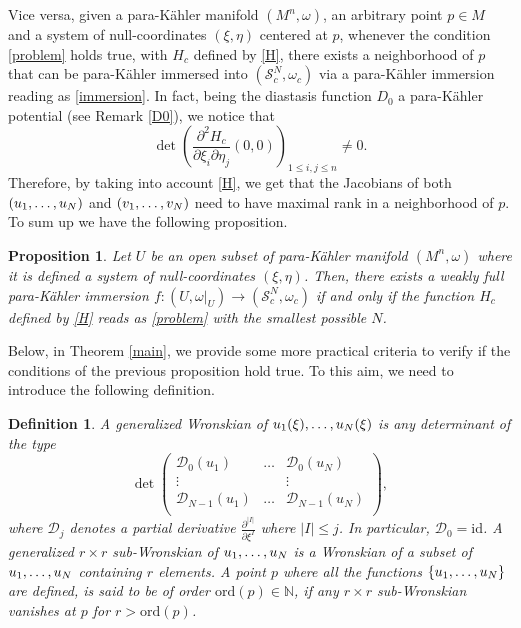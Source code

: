 \documentclass{article}
\newtheorem{df}[thm]{Definition}
\newtheorem{prop}[thm]{Proposition}
\newcommand{\de}{\partial}
\newcommand{\s}{\mathcal{S}}
\newcommand{\pk}{para-K\"ahler }
\newcommand{\ord}{\mathrm{ord}}
\newcommand{\N}{\mathds{N}}
\begin{document}
Vice versa, given a \pk manifold $(M^n,\omega)$, an arbitrary point $p\in M$ and a system of null-coordinates $(\xi,\eta)$ centered at $p$, whenever the condition \eqref{problem} holds true, with $H_c$  defined by \eqref{H}, there exists  a neighborhood of $p$ that can be \pk immersed into $(\s_c^N,\omega_c)$ via a \pk immersion reading as \eqref{immersion}. In fact, being the diastasis function $D_0$ a \pk potential (see Remark \ref{D0}), we notice that 
$$\det\left(\frac{\de^2 H_c}{\de \xi_i\de\eta_j}(0,0)\right)_{1\leq i,j\leq n}\neq 0.$$ Therefore,  by taking into account \eqref{H}, we get that  the Jacobians of both $(u_1,\mathellipsis,u_N)$ and $(v_1,\mathellipsis,v_N)$  need to have maximal rank in a neighborhood of $p$.
To sum up we have the following  proposition.
\begin{prop}\label{existence}
Let $U$ be an open subset of \pk manifold $(M^n,\omega)$ where it is defined a system of null-coordinates $(\xi,\eta)$. Then, there exists a weakly full \pk immersion
 $f: (U,\omega|_U)\to (\s_c^N,\omega_c)$
if and only if the function $H_c$ defined by \eqref{H} reads as \eqref{problem} with the smallest possible $N$. 
\end{prop}
Below, in Theorem  \ref{main}, we provide some more practical criteria to verify if the conditions of the previous proposition hold true. To this aim, we need to  introduce the following definition.
\begin{df}
A \emph{generalized Wronskian} of $u_1(\xi),\mathellipsis,u_N(\xi)$ is any determinant of the type
$$\det\begin{pmatrix}
\mathcal{D}_0(u_1)&\dots&\mathcal{D}_0(u_N) \\
\vdots & &\vdots\\
\mathcal{D}_{N-1}(u_1)&\dots&\mathcal{D}_{N-1}(u_N)\\
\end{pmatrix},$$
where $\mathcal{D}_j$ denotes a partial derivative $\frac{\de^{|I|}}{\de\xi^I}$ where $|I|\leq j$. In particular, $\mathcal{D}_0=\mathrm{id}$. A \emph{generalized $r\times r$ sub-Wronskian} of $u_1,\mathellipsis,u_N$ is a Wronskian of a subset  of $u_1,\mathellipsis,u_N$ containing $r$ elements. A point $p$ where all the functions $\{u_1,\mathellipsis,u_N\}$ are defined,
is said to be of \emph{order} $\ord(p)\in\N$, if any $r\times r$ sub-Wronskian vanishes at $p$ for  $r>\ord(p)$.
\end{df}
\end{document}
